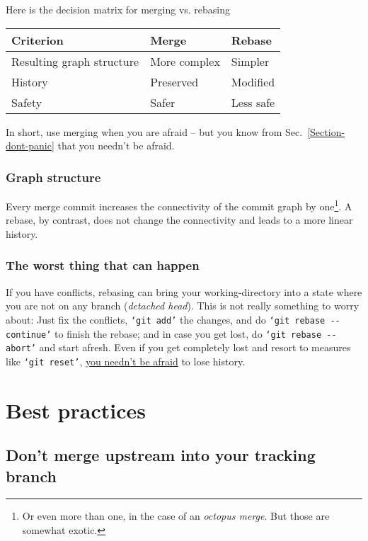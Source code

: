 \documentclass[12pt,pdftex]{article}
\begin{document}
Here is the decision matrix for merging vs. rebasing

\begin{center}
\begin{tabular}{lll}
\toprule
Criterion & Merge & Rebase\\
\midrule
Resulting graph structure & More complex & Simpler\\
History & Preserved & Modified\\
Safety & Safer & Less safe \footnotemark\\
\bottomrule
\end{tabular}
\end{center}

In short, use merging when you are afraid – but you know from
Sec.~\ref{Section-dont-panic} that you needn't be afraid.


\subsubsection{Graph structure}
\label{sec-4-3-1}

Every merge commit increases the connectivity of the commit graph by
one\footnote{Or even more than one, in the case of an \emph{octopus merge}.
But those are somewhat exotic.}.
A rebase, by contrast, does not change the connectivity and leads to a
more linear history.


\subsubsection{The worst thing that can happen}
\label{sec-4-3-2}

If you have conflicts, rebasing can bring your working-directory into
a state where you are not on any branch (\emph{detached head}).
This is not really something to worry about:
Just fix the conflicts, \texttt{‘git add’} the changes, and do \texttt{‘git rebase
    -{}-continue’} to finish the rebase; and in case you get lost, do \texttt{‘git
    rebase -{}-abort’} and start afresh.
Even if you get completely lost and resort to measures like
\texttt{‘git reset’}, \hyperref[sec-3]{you needn't be afraid} to lose history.


\section{Best practices}
\label{sec-5}

\subsection{Don't merge upstream into your tracking branch}
\label{sec-5-1}
\label{S-developing-on-master}
\end{document}
